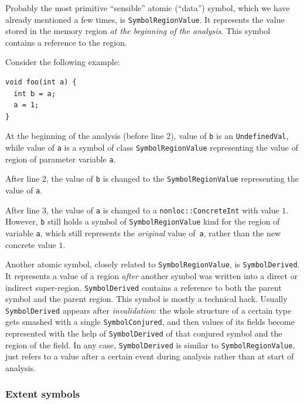 \documentclass[a4paper,12pt]{article}
\newenvironment{nobr}{\begin{minipage}{\textwidth}\setlength\parskip{1em}
}{\end{minipage}\ignorespacesafterend}
\begin{document}
Probably the most primitive ``sensible'' atomic (``data'') symbol, which we have already mentioned a few times, is \lstinline|SymbolRegionValue|. It represents the value stored in the memory region \emph{at the beginning of the analysis}. This symbol contains a reference to the region.

\begin{nobr}
Consider the following example:

\begin{lstlisting}[style=cplusplus]
void foo(int a) {
  int b = a;
  a = 1;
}
\end{lstlisting}
\end{nobr}

At the beginning of the analysis (before line 2), value of \lstinline|b| is an \lstinline|UndefinedVal|, while value of \lstinline|a| is a symbol of class \lstinline|SymbolRegionValue| representing the value of region of parameter variable \lstinline|a|.

After line 2, the value of \lstinline|b| is changed to the \lstinline|SymbolRegionValue| representing the value of \lstinline|a|.

After line 3, the value of \lstinline|a| is changed to a \lstinline|nonloc::ConcreteInt| with value $1$. However, \lstinline|b| still holds a symbol of \lstinline|SymbolRegionValue| kind for the region of variable \lstinline|a|, which still represents the \emph{original} value of~\lstinline|a|, rather than the new concrete value $1$.

Another atomic symbol, closely related to \lstinline|SymbolRegionValue|, is \lstinline|SymbolDerived|. It represents a value of a region \emph{after} another symbol was written into a direct or indirect super-region. \lstinline|SymbolDerived| contains a reference to both the parent symbol and the parent region. This symbol is mostly a technical hack. Usually \lstinline|SymbolDerived| appears after \emph{invalidation}: the whole structure of a certain type gets smashed with a single \lstinline|SymbolConjured|, and then values of its fields become represented with the help of \lstinline|SymbolDerived| of that conjured symbol and the region of the field. In any case, \lstinline|SymbolDerived| is similar to \lstinline|SymbolRegionValue|, just refers to a value after a certain event during analysis rather than at start of analysis.

\subsubsection{Extent symbols}
\end{document}
